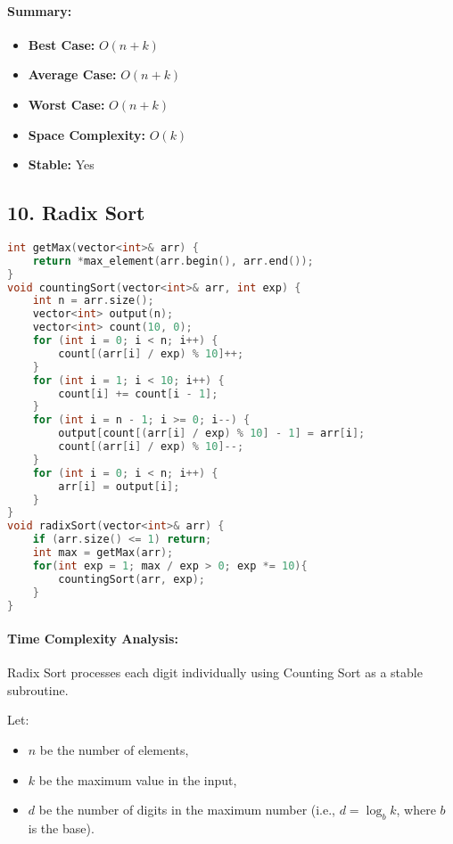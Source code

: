 \paragraph{Summary:}
\begin{itemize}
  \item \textbf{Best Case:} \( O(n + k) \)
  \item \textbf{Average Case:} \( O(n + k) \)
  \item \textbf{Worst Case:} \( O(n + k) \)
  \item \textbf{Space Complexity:} \( O(k) \)
  \item \textbf{Stable:} Yes
\end{itemize}

\subsection*{\textbf{10. Radix Sort}}
\begin{lstlisting}[language=C++, caption={Radix Sort (LSD, Non-negative Integers)}]
int getMax(vector<int>& arr) {
    return *max_element(arr.begin(), arr.end());
}
void countingSort(vector<int>& arr, int exp) {
    int n = arr.size();
    vector<int> output(n);
    vector<int> count(10, 0);
    for (int i = 0; i < n; i++) {
        count[(arr[i] / exp) % 10]++;
    }
    for (int i = 1; i < 10; i++) {
        count[i] += count[i - 1];
    }
    for (int i = n - 1; i >= 0; i--) {
        output[count[(arr[i] / exp) % 10] - 1] = arr[i];
        count[(arr[i] / exp) % 10]--;
    }
    for (int i = 0; i < n; i++) {
        arr[i] = output[i];
    }
}
void radixSort(vector<int>& arr) {
    if (arr.size() <= 1) return;
    int max = getMax(arr);
    for(int exp = 1; max / exp > 0; exp *= 10){
        countingSort(arr, exp);
    }
}
\end{lstlisting}

\paragraph{Time Complexity Analysis:}
Radix Sort processes each digit individually using Counting Sort as a stable subroutine.

Let:
\begin{itemize}
  \item \( n \) be the number of elements,
  \item \( k \) be the maximum value in the input,
  \item \( d \) be the number of digits in the maximum number (i.e., \( d = \log_{b} k \), where \( b \) is the base).
\end{itemize}

